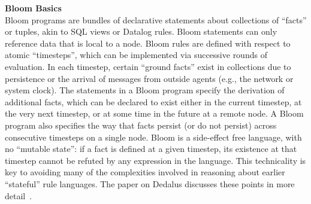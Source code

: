 \noindent\textbf{Bloom Basics}\\
\noindent
Bloom programs are bundles of declarative statements about collections of ``facts'' or tuples, akin to SQL views or Datalog rules.  Bloom statements can only reference data that is local to a node.  Bloom rules are defined with respect to atomic ``timesteps'', which can be implemented via successive rounds of evaluation. In each timestep, certain ``ground facts'' exist in collections due to persistence or the arrival of messages from outside agents (e.g., the network or system clock).  The statements in a Bloom program specify the derivation of additional facts, which can be declared to exist either in the current timestep, at the very next timestep, or at some time in the future at a remote node.  A Bloom program also specifies the way that facts persist (or do not persist) across consecutive timesteps on a single node.  Bloom is a side-effect free language, with no ``mutable state'': if a fact is defined at a given timestep, its existence at that timestep cannot be refuted by any expression in the language.  This technicality is key to avoiding many of the complexities involved in reasoning about earlier ``stateful'' rule languages.  The paper on Dedalus discusses these points in more detail~\cite{dedalus-techr}.

